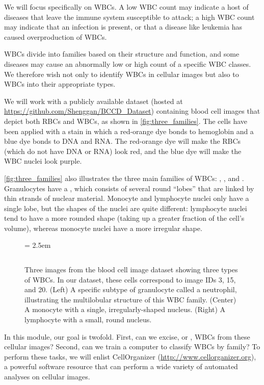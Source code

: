 We will focus specifically on WBCs. A low WBC count may indicate a host of diseases that leave the immune system susceptible to attack; a high WBC count may indicate that an infection is present, or that a disease like leukemia has caused overproduction of WBCs.

WBCs divide into families based on their structure and function, and some diseases may cause an abnormally low or high count of a specific WBC classes. We therefore wish not only to identify WBCs in cellular images but also to  WBCs into their appropriate types.

We will work with a publicly available dataset (hosted at \url{https://github.com/Shenggan/BCCD_Dataset}) containing blood cell images that depict both RBCs and WBCs, as shown in \autoref{fig:three_families}. The cells have been applied with a stain in which a red-orange dye bonds to hemoglobin and a blue dye bonds to DNA and RNA. The red-orange dye will make the RBCs (which do not have DNA or RNA) look red, and the blue dye will make the WBC nuclei look purple.

\autoref{fig:three_families} also illustrates the three main families of WBCs: , , and .  Granulocytes have a , which consists of several round “lobes” that are linked by thin strands of nuclear material. Monocyte and lymphocyte nuclei only have a single lobe, but the shapes of the nuclei are quite different: lymphocyte nuclei tend to have a more rounded shape (taking up a greater fraction of the cell’s volume), whereas monocyte nuclei have a more irregular shape.

\begin{figure}[p]
\centering
\tabcolsep = 2.5em
\mySfFamily
\begin{tabular}{c c c}
\end{tabular}
\caption{Three images from the blood cell image dataset showing three types of WBCs. In our dataset, these cells correspond to image IDs 3, 15, and 20. (Left) A specific subtype of granulocyte called a neutrophil, illustrating the multilobular structure of this WBC family. (Center) A monocyte with a single, irregularly-shaped nucleus. (Right) A lymphocyte with a small, round nucleus.}
\label{fig:alignment_game}
\end{figure}

In this module, our goal is twofold. First, can we excise, or , WBCs from these cellular images? Second, can we train a computer to classify WBCs by family? To perform these tasks, we will enlist CellOrganizer (\url{http://www.cellorganizer.org}), a powerful software resource that can perform a wide variety of automated analyses on cellular images.

